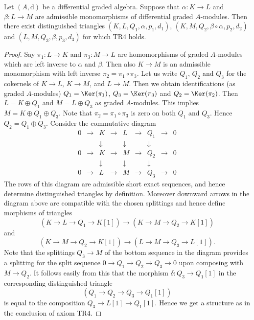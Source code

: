 \begin{lemma}
\label{lemma-two-split-injections}
Let $(A, \text{d})$ be a differential graded algebra. Suppose that
$\alpha : K \to L$ and $\beta : L \to M$ are admissible monomorphisms
of differential graded $A$-modules. Then there exist distinguished triangles
$(K, L, Q_1, \alpha, p_1, d_1)$, $(K, M, Q_2, \beta \circ \alpha, p_2, d_2)$
and $(L, M, Q_3, \beta, p_3, d_3)$ for which TR4 holds.
\end{lemma}

\begin{proof}
Say $\pi_1 : L \to K$ and $\pi_3 : M \to L$ are homomorphisms
of graded $A$-modules which are left inverse to $\alpha$ and $\beta$.
Then also $K \to M$ is an admissible monomorphism with left
inverse $\pi_2 = \pi_1 \circ \pi_3$. Let us write $Q_1$, $Q_2$
and $Q_3$ for the cokernels of $K \to L$, $K \to M$, and $L \to M$.
Then we obtain identifications (as graded $A$-modules)
$Q_1 = \Ker(\pi_1)$, $Q_3 = \Ker(\pi_3)$ and
$Q_2 = \Ker(\pi_2)$. Then $L = K \oplus Q_1$ and
$M = L \oplus Q_3$ as graded $A$-modules. This implies
$M = K \oplus Q_1 \oplus Q_3$. Note that $\pi_2 = \pi_1 \circ \pi_3$
is zero on both $Q_1$ and $Q_3$. Hence $Q_2 = Q_1 \oplus Q_3$.
Consider the commutative diagram
$$
\begin{matrix}
0 & \to & K & \to & L & \to & Q_1 & \to & 0 \\
  &     & \downarrow&     & \downarrow&     & \downarrow  & \\
0 & \to & K & \to & M & \to & Q_2 & \to & 0 \\
  &     & \downarrow&     & \downarrow&     & \downarrow  & \\
0 & \to & L & \to & M & \to & Q_3 & \to & 0
\end{matrix}
$$
The rows of this diagram are admissible short exact sequences, and
hence determine distinguished triangles by definition. Moreover
downward arrows in the diagram above are compatible with the chosen
splittings and hence define morphisms of triangles
$$
(K \to L \to Q_1 \to K[1])
\longrightarrow
(K \to M \to Q_2 \to K[1])
$$
and
$$
(K \to M \to Q_2 \to K[1])
\longrightarrow
(L \to M \to Q_3 \to L[1]).
$$
Note that the splittings $Q_3 \to M$ of the bottom sequence in the
diagram provides a splitting for the split sequence
$0 \to Q_1 \to Q_2 \to Q_3 \to 0$ upon composing with $M \to Q_2$.
It follows easily from this that the morphism $\delta : Q_3 \to Q_1[1]$
in the corresponding distinguished triangle
$$
(Q_1 \to Q_2 \to Q_3 \to Q_1[1])
$$
is equal to the composition $Q_3 \to L[1] \to Q_1[1]$.
Hence we get a structure as in the conclusion of axiom TR4.
\end{proof}

